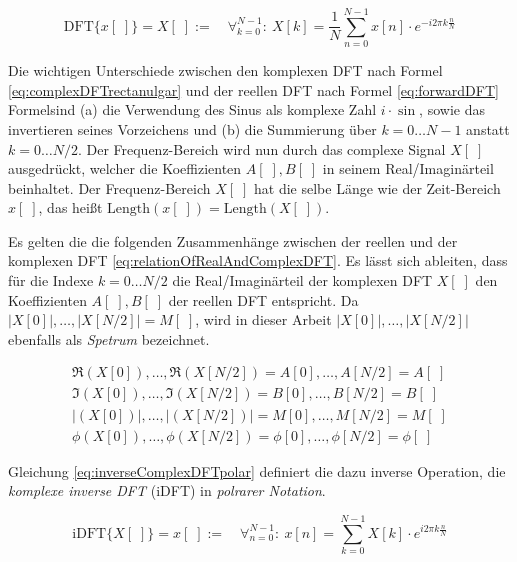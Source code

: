 \begin{equation}
\label{eq:complexDFTpolar}
\text{DFT}\{x[\;]\} = X[\;]  := \quad \mathop{\forall}_{k = 0}^{N-1} :\ X[k] =  \frac{1}{N} \sum_{n = 0}^{N-1}  x[n] \cdot e^{-i 2\pi k \frac{n}{N}}
\end{equation}

Die wichtigen Unterschiede zwischen den komplexen DFT nach Formel  \ref{eq:complexDFTrectanulgar} und der reellen DFT nach Formel \ref{eq:forwardDFT} Formelsind (a) die Verwendung des Sinus als komplexe Zahl $i \cdot \sin$, sowie das invertieren seines Vorzeichens und (b) die Summierung über $k = 0\ldots N-1 $ anstatt $k = 0 \ldots N/2$. Der Frequenz-Bereich wird nun durch das complexe Signal $X[\;]$ ausgedrückt, welcher die Koeffizienten $A[\;],B[\;]$ in seinem Real/Imaginärteil beinhaltet. Der Frequenz-Bereich $X[\;]$ hat die selbe Länge wie der Zeit-Bereich $x[\;]$, das heißt $\text{Length}(x[\;]) = \text{Length}(X[\;])$. \cite[S. 571]{dspGuide}

Es gelten die die folgenden Zusammenhänge zwischen der reellen und der komplexen DFT \ref{eq:relationOfRealAndComplexDFT}. Es lässt sich ableiten, dass für die Indexe $k = 0 \ldots N/2$ die Real/Imaginärteil der komplexen DFT $X[\;]$ den Koeffizienten $A[\;],B[\;]$ der reellen DFT entspricht. Da $|X[0]|,\ldots,|X[N/2]| = M[\;]$, wird in dieser Arbeit $|X[0]|,\ldots,|X[N/2]|$ ebenfalls als \emph{Spetrum} bezeichnet. \cite[S. 225 - 226, 555]{dspGuide}

\begin{equation}
\begin{gathered}
\Re(X[0]) ,\ldots, \Re(X[N/2]) = A[0] ,\ldots, A[N/2] = A[\;] \\
\Im(X[0]) ,\ldots, \Im(X[N/2]) = B[0] ,\ldots, B[N/2] = B[\;]  \\
|(X[0])| ,\ldots, |(X[N/2])| = M[0] ,\ldots, M[N/2] = M[\;] \\
\phi(X[0]) ,\ldots, \phi(X[N/2]) = \phi[0] ,\ldots, \phi[N/2] = \phi[\;]
\end{gathered}
\label{eq:relationOfRealAndComplexDFT}
\end{equation}

Gleichung \ref{eq:inverseComplexDFTpolar} definiert die dazu inverse Operation, die \emph{komplexe inverse DFT} (iDFT) in \emph{polrarer Notation}. \cite[S. 572]{dspGuide}

\begin{equation}
\label{eq:inverseComplexDFTpolar}
\text{iDFT}\{X[\;]\} = x[\;] := \quad \mathop{\forall}_{n = 0}^{N-1} :\ x[n] = \sum_{k = 0}^{N-1}  X[k] \cdot e^{i 2\pi k \frac{n}{N}}
\end{equation}


